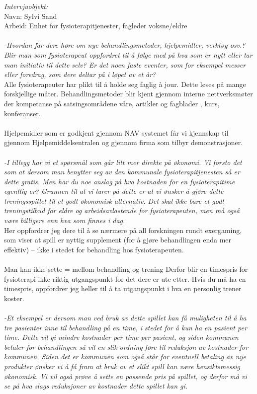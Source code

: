 \emph{Intervjuobjekt:}\\
Navn: Sylvi Sand \\
Arbeid: Enhet for fysioterapitjenester, fagleder voksne/eldre \\ \\
\emph{-Hvordan får dere høre om nye behandlingsmetoder, hjelpemidler, verktøy osv.? Blir man som fysioterapeut oppfordret til å følge med på hva som er nytt eller tar man initiativ til dette selv? Er det noen faste eventer, som for eksempel messer eller foredrag, som dere deltar på i løpet av et år?} \\
Alle fysioterapeuter har plikt til å holde seg faglig à jour. Dette løses på mange forskjellige måter. Behandlingsmetoder blir kjent gjennom interne nettverksmøter der kompetanse på satsingsområdene våre, artikler og fagblader , kurs, konferanser. \\ \\ 
Hjelpemidler som er godkjent gjennom NAV systemet får vi kjennskap til gjennom Hjelpemiddelsentralen og gjennom firma som tilbyr demonstrasjoner. \\ \\
\emph{-I tillegg har vi et spørsmål som går litt mer direkte på økonomi. Vi forsto det som at dersom man benytter seg av den kommunale fysioterapitjenesten så er dette gratis. Men har du noe anslag på hva kostnaden for en fysioterapitime egentlig er? Grunnen til at vi lurer på dette er at vi ønsker å gjøre dette treningsspillet til et godt økonomisk alternativ. Det skal ikke bare et godt treningstilbud for eldre og arbeidsavlastende for fysioterapeuten, men må også være billigere enn hva som finnes i dag.} \\
 Her oppfordrer jeg dere til  å se nærmere på all forskningen rundt exergaming, som viser at spill er nyttig supplement (for å gjøre behandlingen enda mer effektiv) – ikke i stedet for behandling hos fysioterapeuten.\\ \\ 
Man kan ikke sette = mellom behandling og trening
Derfor blir en  timespris for fysioterapi ikke riktig  utgangspunkt for det dere er ute etter. Hvis du må ha en timespris, oppfordrer jeg heller til å ta utgangspunkt i hva en personlig trener koster. \\ \\
\emph{-Et eksempel er dersom man ved bruk av dette spillet kan få muligheten til å ha tre pasienter inne til behandling på en time, i stedet for å kun ha en pasient per time. Dette vil gi mindre kostnader per time per pasient, og siden kommunen betaler for behandlingen så vil en slik ordning føre til reduksjon av kostnader for kommunen. Siden det er kommunen som også står for eventuell betaling av nye produkter ønsker vi å få fram at bruk av et slikt spill kan være hensiktsmessig økonomisk. Vi vil også prøve å sette en passende pris på spillet, og derfor må vi se på hva slags reduksjoner av kostnader dette spillet kan gi.} \\ 
